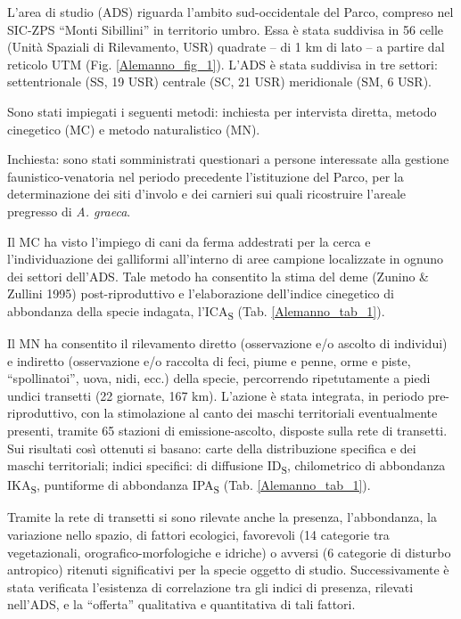 L{\textquoteright}area di studio (ADS) riguarda l{\textquoteright}ambito
sud-occidentale del Parco, compreso nel SIC-ZPS
{\textquotedblleft}Monti Sibillini{\textquotedblright} in territorio
umbro. Essa \`e stata suddivisa in 56 celle (Unit\`a Spaziali di
Rilevamento, USR) quadrate -- di 1 km di lato -- a partire dal reticolo
UTM (Fig. \ref{Alemanno_fig_1}). L{\textquoteright}ADS \`e stata suddivisa in tre settori:
settentrionale (SS, 19 USR) centrale (SC, 21 USR) meridionale (SM, 6
USR).

Sono stati impiegati i seguenti metodi: inchiesta per intervista diretta, metodo cinegetico (MC) e
metodo naturalistico (MN).

Inchiesta: sono stati somministrati questionari a persone interessate
alla gestione fa\allowbreak u\allowbreak nis\allowbreak ti\allowbreak co-\allowbreak ve\allowbreak na\allowbreak to\allowbreak ria nel periodo precedente
l{\textquoteright}istituzione del Parco, per la determinazione dei siti
d{\textquoteright}involo e dei carnieri sui quali ricostruire
l{\textquoteright}areale pregresso di \textit{A. graeca}.

Il MC ha visto l{\textquoteright}impiego di cani da ferma addestrati per
la cerca e l{\textquoteright}individuazione dei galliformi
all{\textquoteright}interno di aree campione localizzate in ognuno dei
settori dell{\textquoteright}ADS. Tale metodo ha consentito la stima
del deme (Zunino \& Zullini 1995) post-riproduttivo e
l{\textquoteright}elaborazione dell{\textquoteright}indice cinegetico
di abbondanza della specie indagata,
l{\textquoteright}ICA\textsubscript{S} (Tab. \ref{Alemanno_tab_1}).

Il MN ha consentito il rilevamento diretto (osservazione e/o ascolto di
individui) e indiretto (osservazione e/o raccolta di feci, piume e
penne, orme e piste,
{\textquotedblleft}spollinatoi{\textquotedblright}, uova, nidi, ecc.)
della specie, percorrendo ripetutamente a piedi undici transetti (22
giornate, 167 km). L{\textquoteright}azione \`e stata integrata, in
periodo pre-riproduttivo, con la stimolazione al canto dei maschi
territoriali eventualmente presenti, tramite 65 stazioni di
emissione-ascolto, disposte sulla rete di transetti. Sui risultati
cos\`i ottenuti si basano: carte della distribuzione specifica e dei
maschi territoriali; indici specifici: di diffusione
ID\textsubscript{S}, chilometrico di abbondanza IKA\textsubscript{S},
puntiforme di abbondanza IPA\textsubscript{S }(Tab. \ref{Alemanno_tab_1}).

Tramite la rete di transetti si sono rilevate anche la presenza,
l{\textquoteright}abbondanza, la variazione nello spazio, di fattori
ecologici, favorevoli (14 categorie tra vegetazionali,
orografico-morfologiche e idriche) o avversi (6 categorie di disturbo
antropico) ritenuti significativi per la specie oggetto di studio.
Successivamente \`e stata verificata l{\textquoteright}esistenza di
correlazione tra gli indici di presenza, rilevati
nell{\textquoteright}ADS, e la
{\textquotedblleft}offerta{\textquotedblright} qualitativa e
quantitativa di tali fattori.

